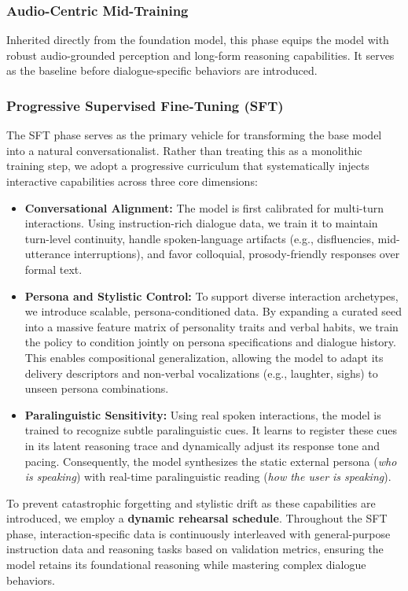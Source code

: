 \subsubsection{Audio-Centric Mid-Training}
Inherited directly from the foundation model, this phase equips the model with robust audio-grounded perception and long-form reasoning capabilities. It serves as the baseline before dialogue-specific behaviors are introduced.

\subsubsection{Progressive Supervised Fine-Tuning (SFT)}
\label{sec:realtime_sft}
The SFT phase serves as the primary vehicle for transforming the base model into a natural conversationalist. Rather than treating this as a monolithic training step, we adopt a progressive curriculum that systematically injects interactive capabilities across three core dimensions:

\begin{itemize}
    \item \textbf{Conversational Alignment:} The model is first calibrated for multi-turn interactions. Using instruction-rich dialogue data, we train it to maintain turn-level continuity, handle spoken-language artifacts (e.g., disfluencies, mid-utterance interruptions), and favor colloquial, prosody-friendly responses over formal text.
    \item \textbf{Persona and Stylistic Control:} To support diverse interaction archetypes, we introduce scalable, persona-conditioned data. By expanding a curated seed into a massive feature matrix of personality traits and verbal habits, we train the policy to condition jointly on persona specifications and dialogue history. This enables compositional generalization, allowing the model to adapt its delivery descriptors and non-verbal vocalizations (e.g., laughter, sighs) to unseen persona combinations.
    \item \textbf{Paralinguistic Sensitivity:} Using real spoken interactions, the model is trained to recognize subtle paralinguistic cues. It learns to register these cues in its latent reasoning trace and dynamically adjust its response tone and pacing. Consequently, the model synthesizes the static external persona (\emph{who is speaking}) with real-time paralinguistic reading (\emph{how the user is speaking}).
\end{itemize}

To prevent catastrophic forgetting and stylistic drift as these capabilities are introduced, we employ a \textbf{dynamic rehearsal schedule}. Throughout the SFT phase, interaction-specific data is continuously interleaved with general-purpose instruction data and reasoning tasks based on validation metrics, ensuring the model retains its foundational reasoning while mastering complex dialogue behaviors.


